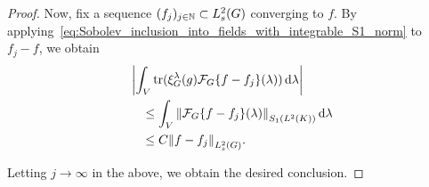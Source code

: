 \begin{proof}
    Now, fix a sequence $(f_j)_{j \in \N} \subset \Sobolev s$ converging to $f$.
    By applying~\eqref{eq:Sobolev_inclusion_into_fields_with_integrable_S1_norm} to $f_j - f$,
    we obtain
    \begin{align*}
        &\abs {\int_\VectorSpace \tr(\Rep \lambda (g)\Fourier \{f - f_j\}(\lambda)) \dd \lambda}\\
        &\quad \leq \int_\VectorSpace \norm [\SchattenClasses 1 {\Lebesgue 2 \CompactGroup}] {\Fourier \{f - f_j\}(\lambda)} \dd \lambda\\
        &\quad \leq C \norm [\Sobolev s] {f - f_j}.
    \end{align*}

    Letting $j \to \infty$ in the above,
    we obtain the desired conclusion.
\end{proof}

